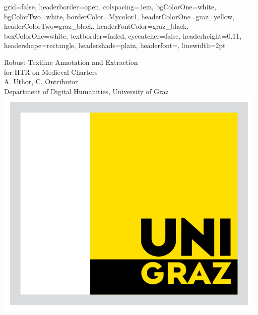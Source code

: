 \documentclass[a0paper,portrait]{baposter}
\begin{document}

\begin{poster}
{
grid=false,
headerborder=open, %
colspacing=1em, %
bgColorOne=white, %
bgColorTwo=white, %
borderColor=Mycolor1, %
headerColorOne=graz_yellow, %
headerColorTwo=graz_black, %
headerFontColor=graz_black, %
boxColorOne=white, %
textborder=faded, %
eyecatcher=false, %
headerheight=0.11\textheight, %
headershape=rectangle, %
headershade=plain,
headerfont=\Large\textsf, %
linewidth=2pt %
}

%
{
\textsf{Robust Textline Annotation and Extraction\\ for HTR on Medieval Charters}
}
{
\sf\vspace{.2em}\\
A. Uthor, C. Ontributor
\vspace{.2em}\\
{\small Department of Digital Humanities, University of Graz}
}
{
\includegraphics[width=.17\linewidth]{unigraz_logo.png} %
}


\end{poster}
\end{document}
